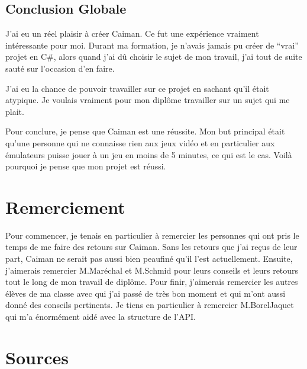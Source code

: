 \documentclass[a4paper,12pt,french]{sphinxmanual}
\begin{document}
\section{Conclusion Globale}
\label{\detokenize{conclusion:conclusion-globale}}
\sphinxAtStartPar
J’ai eu un réel plaisir à créer Caiman. Ce fut une expérience vraiment intéressante pour moi. Durant ma formation, je n’avais jamais pu créer de “vrai” projet en C\#, alors quand j’ai dû choisir le sujet de mon travail, j’ai tout de suite sauté sur l’occasion d’en faire.

\sphinxAtStartPar
J’ai eu la chance de pouvoir travailler sur ce projet en sachant qu’il était atypique. Je voulais vraiment pour mon diplôme travailler sur un sujet qui me plait.

\sphinxAtStartPar
Pour conclure, je pense que Caiman est une réussite. Mon but principal était qu’une personne qui ne connaisse rien aux jeux vidéo et en particulier aux émulateurs puisse jouer à un jeu en moins de 5 minutes, ce qui est le cas. Voilà pourquoi je pense que mon projet est réussi.


\chapter{Remerciement}
\label{\detokenize{remerciment:remerciement}}\label{\detokenize{remerciment::doc}}
\sphinxAtStartPar
Pour commencer, je tenais en particulier à remercier les personnes qui ont pris le temps de me faire des retours sur Caiman. Sans les retours que j’ai reçus de leur part, Caiman ne serait pas aussi bien peaufiné qu’il l’est actuellement. Ensuite, j’aimerais remercier M.Maréchal et M.Schmid pour leurs conseils et leurs retours tout le long de mon travail de diplôme. Pour finir, j’aimerais remercier les autres élèves de ma classe avec qui j’ai passé de très bon moment et qui m’ont aussi donné des conseils pertinents. Je tiens en particulier à remercier M.Borel\sphinxhyphen{}Jaquet qui m’a énormément aidé avec la structure de l’API.


\chapter{Sources}
\label{\detokenize{sources:sources}}\label{\detokenize{sources::doc}}
\sphinxAtStartPar
{}

\sphinxAtStartPar
{}
\end{document}

